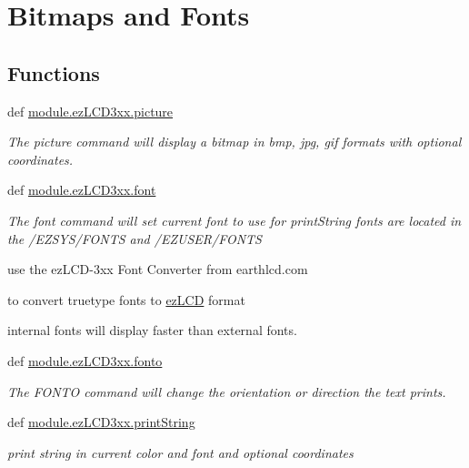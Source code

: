 \hypertarget{group___bitmap_font}{\section{Bitmaps and Fonts}
\label{d2/d7e/group___bitmap_font}
}
\subsection*{Functions}
\begin{DoxyCompactItemize}
\item 
def \hyperlink{group___bitmap_font_ga675ef467cb7a69ab8c19024bfd0775d6}{module.\-ez\-L\-C\-D3xx.\-picture}
\begin{DoxyCompactList}\small\item\em The picture command will display a bitmap in bmp, jpg, gif formats with optional coordinates. \end{DoxyCompactList}\item 
def \hyperlink{group___bitmap_font_gaf4cf49efa8ac77f85a27f2bafe6b80cf}{module.\-ez\-L\-C\-D3xx.\-font}
\begin{DoxyCompactList}\small\item\em The font command will set current font to use for print\-String fonts are located in the /\-E\-Z\-S\-Y\-S/\-F\-O\-N\-T\-S and /\-E\-Z\-U\-S\-E\-R/\-F\-O\-N\-T\-S \par
 use the ez\-L\-C\-D-\/3xx Font Converter from earthlcd.\-com \par
 to convert truetype fonts to \hyperlink{classmodule_1_1ez_l_c_d3xx_1_1ez_l_c_d}{ez\-L\-C\-D} format \par
 internal fonts will display faster than external fonts. \end{DoxyCompactList}\item 
def \hyperlink{group___bitmap_font_ga9e4a0699fcde7bdd65fd97720b60b3d3}{module.\-ez\-L\-C\-D3xx.\-fonto}
\begin{DoxyCompactList}\small\item\em The F\-O\-N\-T\-O command will change the orientation or direction the text prints. \end{DoxyCompactList}\item 
def \hyperlink{group___bitmap_font_ga9156f7c9f1239d24a3a8a7ade64291d8}{module.\-ez\-L\-C\-D3xx.\-print\-String}
\begin{DoxyCompactList}\small\item\em print string in current color and font and optional coordinates \end{DoxyCompactList}\end{DoxyCompactItemize}



